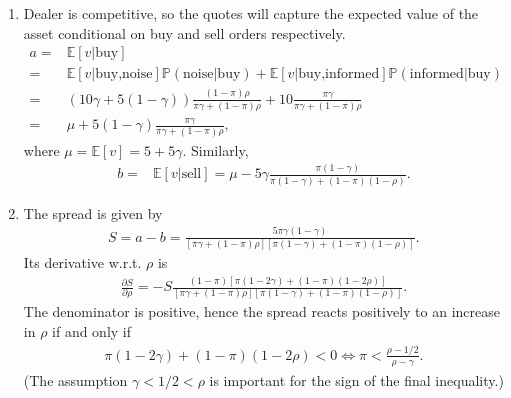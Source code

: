 \begin{solution}
	
	\begin{enumerate}
		\item Dealer is competitive, so the quotes will capture the expected value of the asset conditional on buy and sell orders respectively.
		\begin{align*}
			a =& \mathbb{E} \left[ v | \text{buy} \right]
			\\
			=& \mathbb{E} \left[ v | \text{buy,noise} \right] \mathbb{P}\left( \text{noise} | \text{buy} \right) + \mathbb{E} \left[ v | \text{buy,informed} \right] \mathbb{P}\left( \text{informed} | \text{buy} \right)
			\\
			=& (10\gamma + 5(1-\gamma)) \frac{(1-\pi)\rho}{\pi \gamma + (1-\pi)\rho} + 10 \frac{\pi \gamma}{\pi \gamma + (1-\pi)\rho}
			\\
			=& \mu + 5 (1-\gamma) \frac{\pi \gamma}{\pi \gamma + (1-\pi)\rho},
		\end{align*}
		where $\mu = \mathbb{E}[v] = 5 + 5\gamma$. Similarly,
		\begin{align*}
			b =& \mathbb{E} \left[ v | \text{sell} \right] = \mu - 5\gamma \frac{\pi (1-\gamma)}{\pi (1-\gamma) + (1-\pi)(1-\rho)}.
		\end{align*}
		
		\item The spread is given by
		\begin{align*}
			S = a - b = \frac{5 \pi \gamma (1-\gamma)}{\left[ \pi \gamma + (1-\pi)\rho \right] \left[ \pi (1-\gamma) + (1-\pi)(1-\rho) \right]}.
		\end{align*}
		Its derivative w.r.t. $\rho$ is
		\begin{align*}
			\frac{\partial S}{\partial \rho} = -S \frac{(1-\pi)\left[ \pi(1-2\gamma) + (1-\pi)(1-2\rho) \right]}{\left[ \pi \gamma + (1-\pi)\rho \right] \left[ \pi (1-\gamma) + (1-\pi)(1-\rho) \right]}.
		\end{align*}
		The denominator is positive, hence the spread reacts positively to an increase in $\rho$ if and only if
		\begin{align*}
			\pi(1-2\gamma) + (1-\pi)(1-2\rho) < 0
			\Leftrightarrow \pi < \frac{\rho - 1/2}{\rho - \gamma}.
		\end{align*}
		(The assumption $\gamma < 1/2 < \rho$ is important for the sign of the final inequality.)
		

\end{enumerate}
\end{solution}
